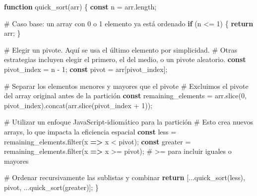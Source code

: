 \documentclass[
  spanish,
  letterpaper,
  DIV=11,
  numbers=noendperiod]{scrreprt}
\newenvironment{Shaded}{\begin{snugshade}}{\end{snugshade}}
\newcommand{\AttributeTok}[1]{\textcolor[rgb]{0.40,0.45,0.13}{#1}}
\newcommand{\ControlFlowTok}[1]{\textcolor[rgb]{0.00,0.23,0.31}{\textbf{#1}}}
\newcommand{\DataTypeTok}[1]{\textcolor[rgb]{0.68,0.00,0.00}{#1}}
\newcommand{\DecValTok}[1]{\textcolor[rgb]{0.68,0.00,0.00}{#1}}
\newcommand{\FunctionTok}[1]{\textcolor[rgb]{0.28,0.35,0.67}{#1}}
\newcommand{\KeywordTok}[1]{\textcolor[rgb]{0.00,0.23,0.31}{\textbf{#1}}}
\newcommand{\NormalTok}[1]{\textcolor[rgb]{0.00,0.23,0.31}{#1}}
\newcommand{\OperatorTok}[1]{\textcolor[rgb]{0.37,0.37,0.37}{#1}}
\begin{document}
\begin{Shaded}
\begin{Highlighting}[]
\KeywordTok{function} \FunctionTok{quick\_sort}\NormalTok{(arr) \{}
    \KeywordTok{const}\NormalTok{ n }\OperatorTok{=}\NormalTok{ arr}\OperatorTok{.}\AttributeTok{length}\OperatorTok{;}
    
\NormalTok{    \# Caso }\DataTypeTok{base}\OperatorTok{:}\NormalTok{ un array con }\DecValTok{0}\NormalTok{ o }\DecValTok{1}\NormalTok{ elemento ya está ordenado}
    \ControlFlowTok{if}\NormalTok{ (n }\OperatorTok{\textless{}=} \DecValTok{1}\NormalTok{) \{}
        \ControlFlowTok{return}\NormalTok{ arr}\OperatorTok{;}
\NormalTok{    \}}
    
\NormalTok{    \# Elegir un pivote}\OperatorTok{.} \AttributeTok{Aquí}\NormalTok{ se usa el último elemento por simplicidad}\OperatorTok{.}
\NormalTok{    \# Otras estrategias incluyen elegir el primero}\OperatorTok{,}\NormalTok{ el del medio}\OperatorTok{,}\NormalTok{ o un pivote aleatorio}\OperatorTok{.}
    \KeywordTok{const}\NormalTok{ pivot\_index }\OperatorTok{=}\NormalTok{ n }\OperatorTok{{-}} \DecValTok{1}\OperatorTok{;}
    \KeywordTok{const}\NormalTok{ pivot }\OperatorTok{=}\NormalTok{ arr[pivot\_index]}\OperatorTok{;}
    
\NormalTok{    \# Separar los elementos menores y mayores que el pivote}
\NormalTok{    \# Excluimos el pivote del array original antes de la partición}
    \KeywordTok{const}\NormalTok{ remaining\_elements }\OperatorTok{=}\NormalTok{ arr}\OperatorTok{.}\FunctionTok{slice}\NormalTok{(}\DecValTok{0}\OperatorTok{,}\NormalTok{ pivot\_index)}\OperatorTok{.}\FunctionTok{concat}\NormalTok{(arr}\OperatorTok{.}\FunctionTok{slice}\NormalTok{(pivot\_index }\OperatorTok{+} \DecValTok{1}\NormalTok{))}\OperatorTok{;}
    
\NormalTok{    \# Utilizar un enfoque JavaScript}\OperatorTok{{-}}\NormalTok{idiomático para la partición}
\NormalTok{    \# Esto crea nuevos arrays}\OperatorTok{,}\NormalTok{ lo que impacta la eficiencia espacial}
    \KeywordTok{const}\NormalTok{ less }\OperatorTok{=}\NormalTok{ remaining\_elements}\OperatorTok{.}\FunctionTok{filter}\NormalTok{(x }\KeywordTok{=\textgreater{}}\NormalTok{ x }\OperatorTok{\textless{}}\NormalTok{ pivot)}\OperatorTok{;}
    \KeywordTok{const}\NormalTok{ greater }\OperatorTok{=}\NormalTok{ remaining\_elements}\OperatorTok{.}\FunctionTok{filter}\NormalTok{(x }\KeywordTok{=\textgreater{}}\NormalTok{ x }\OperatorTok{\textgreater{}=}\NormalTok{ pivot)}\OperatorTok{;}\NormalTok{ \# }\OperatorTok{\textgreater{}=}\NormalTok{ para incluir iguales o mayores}
    
\NormalTok{    \# Ordenar recursivamente las sublistas y combinar}
    \ControlFlowTok{return}\NormalTok{ [}\OperatorTok{...}\FunctionTok{quick\_sort}\NormalTok{(less)}\OperatorTok{,}\NormalTok{ pivot}\OperatorTok{,} \OperatorTok{...}\FunctionTok{quick\_sort}\NormalTok{(greater)]}\OperatorTok{;}
\NormalTok{\}}
\end{Highlighting}
\end{Shaded}
\end{document}
